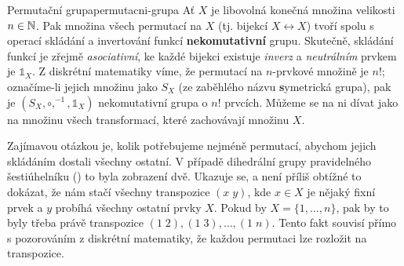 \begin{example}{Permutační grupa}{permutacni-grupa}
 Ať $X$ je libovolná konečná množina velikosti $n \in \mathbb{N}$. Pak množina všech
 permutací na $X$ (tj. bijekcí $X \leftrightarrow X$) tvoří spolu s operací
 skládání a invertování funkcí \textbf{nekomutativní} grupu. Skutečně, skládání
 funkcí je zřejmě \emph{asociativní}, ke každé bijekci existuje \emph{inverz} a
 \emph{neutrálním} prvkem je $\mathds{1}_{X}$. Z diskrétní matematiky víme, že
 permutací na $n$-prvkové množině je $n!$; označíme-li jejich množinu jako $S_X$
 (ze zaběhlého názvu \textbf{s}ymetrická grupa), pak je $(S_X,
 \circ,^{-1},\mathds{1}_{X})$ nekomutativní grupa o $n!$ prvcích. Můžeme se na
 ni dívat jako na množinu všech transformací, které zachovávají množinu $X$.

 Zajímavou otázkou je, kolik potřebujeme nejméně permutací, abychom jejich
 skládáním dostali všechny ostatní. V případě dihedrální grupy pravidelného
 šestiúhelníku () to byla zobrazení dvě.
 Ukazuje se, a není příliš obtížné to dokázat, že nám stačí všechny transpozice
 $(x \; y)$, kde $x \in X$ je nějaký fixní prvek a $y$ probíhá všechny ostatní
 prvky $X$. Pokud by $X = \{1,\ldots,n\}$, pak by to byly třeba právě
 transpozice $(1 \; 2), (1 \; 3),\ldots,(1 \; n)$. Tento fakt souvisí přímo s
 pozorováním z diskrétní matematiky, že každou permutaci lze rozložit na
 transpozice. 
\end{example}
